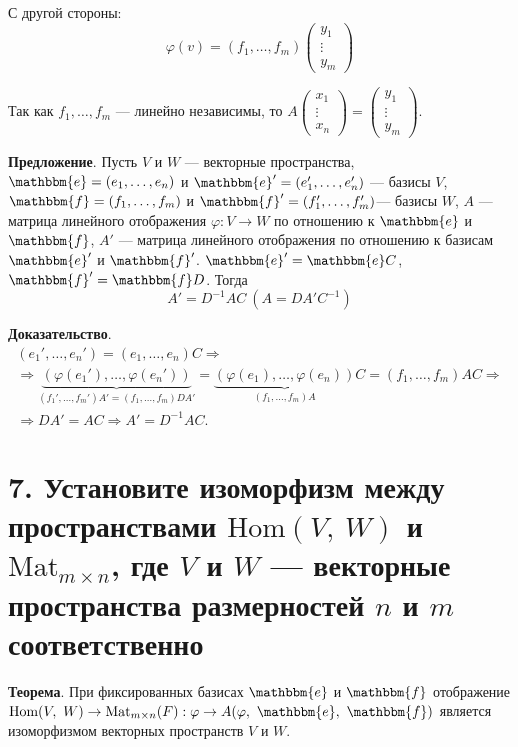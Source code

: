 \documentclass[a4paper, 12pt]{article}
\newcommand{\me}{\mathbbm{e}}
\newcommand{\mf}{\mathbbm{f}}
\newcommand{\Mat}{\text{Mat}}
\begin{document}
С другой стороны:
\vspace{-3mm}
\[
\varphi(v) = (f_1, \ldots, f_m)
\begin{pmatrix}
y_1 \\
\vdots \\
y_m
\end{pmatrix}
\]

Так как $f_1, \ldots, f_m$ --- линейно независимы, то $A
\begin{pmatrix}
x_1 \\
\vdots \\
x_n
\end{pmatrix} =
\begin{pmatrix}
y_1 \\
\vdots \\
y_m
\end{pmatrix}$.

\vspace{5mm}
\textbf{Предложение}. Пусть $V$ и $W$ --- векторные пространства, $\me = (e_1, \ldots, e_n)$ и $\me' = (e_1', \ldots, e_n')$ --- базисы $V$, $\mf = (f_1, \ldots, f_m)$ и $\mf' = (f_1', \ldots, f_m')$--- базисы $W$, $A$ --- матрица линейного отображения $\varphi: V \rightarrow W$ по отношению к $\me$ и $\mf$, $A'$ --- матрица линейного отображения по отношению к базисам $\me'$ и $\mf'$. $\me' = \me C$, $\mf' = \mf D$. Тогда
\vspace{-3mm}
\[
A' = D^{-1}AC\ (A = DA'C^{-1})
\]

\textbf{Доказательство}. 
\vspace{-3mm}
\begin{gather*}
(e_1', \ldots, e_n') = (e_1, \ldots, e_n) C \Rightarrow \\ \Rightarrow \underbrace{(\varphi(e_1'), \ldots, \varphi(e_n'))}_{(f_1', \ldots, f_m')A' = (f_1, \ldots, f_m)DA'} = \underbrace{(\varphi(e_1), \ldots, \varphi(e_n))}_{(f_1, \ldots, f_m)A}C = (f_1, \ldots, f_m) A C \Rightarrow \\ \Rightarrow DA' = AC \Rightarrow A' = D^{-1}AC.
\end{gather*}

\section*{7. Установите изоморфизм между пространствами $\text{Hom}(V,\ W)$ и $\Mat_{m \times n}$, где $V$ и $W$ --- векторные пространства размерностей $n$ и $m$ соответственно}
\textbf{Теорема}. При фиксированных базисах $\me$ и $\mf$ отображение $\text{Hom}(V,\ W) \rightarrow \Mat_{m \times n}(F): \varphi \rightarrow A(\varphi,\ \me,\ \mf)$ является изоморфизмом векторных пространств $V$ и $W$.
\end{document}
